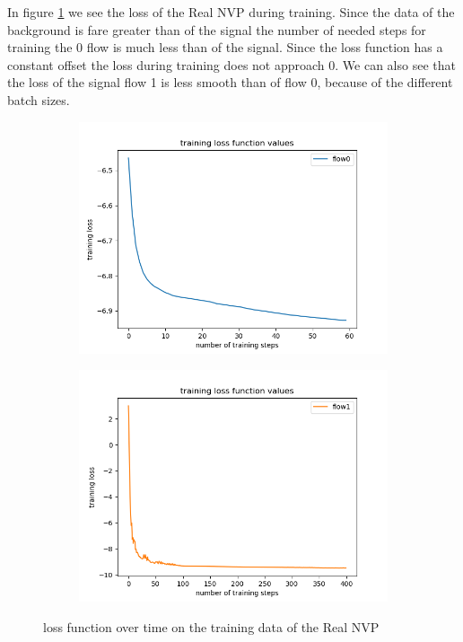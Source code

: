 \documentclass[%
 reprint,
 amsmath,amssymb,
 aps,
]{revtex4-2}
\begin{document}
In figure \ref{fig:losst} we see the loss of the Real NVP during training. Since the data of the background is fare greater than of the signal the number of needed steps for training the 0 flow is much less than of the signal. Since the loss function has a constant offset the loss during training does not approach 0. We can also see that the loss of the signal flow 1 is less smooth than of flow 0, because of the different batch sizes.

 \begin{figure}[ht]
	\centering
	\begin{subfigure}[h]{0.4\textwidth}
		\centering
		\includegraphics[width=\textwidth]{figs/training_loss_0_Real_NVP.png}
	\end{subfigure}
	\hfill
	\begin{subfigure}[h]{0.4\textwidth}  
		\centering 
		\includegraphics[width=\textwidth]{figs/training_loss_1_Real_NVP.png}
	\end{subfigure}
	\caption[ loss function over time on the training data of the Real NVP]
	{\small loss function over time on the training data of the Real NVP} 
	\label{fig:losst}
\end{figure}
\end{document}
